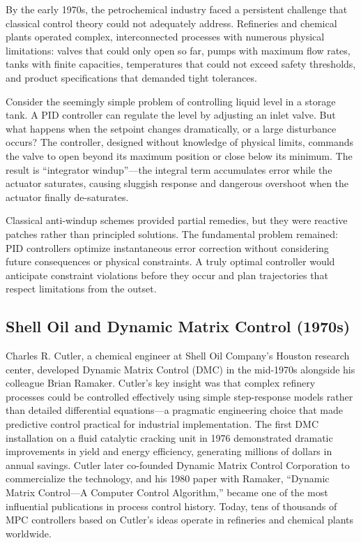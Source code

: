 By the early 1970s, the petrochemical industry faced a persistent challenge that classical control theory could not adequately address. Refineries and chemical plants operated complex, interconnected processes with numerous physical limitations: valves that could only open so far, pumps with maximum flow rates, tanks with finite capacities, temperatures that could not exceed safety thresholds, and product specifications that demanded tight tolerances.

Consider the seemingly simple problem of controlling liquid level in a storage tank. A PID controller can regulate the level by adjusting an inlet valve. But what happens when the setpoint changes dramatically, or a large disturbance occurs? The controller, designed without knowledge of physical limits, commands the valve to open beyond its maximum position or close below its minimum. The result is ``integrator windup''---the integral term accumulates error while the actuator saturates, causing sluggish response and dangerous overshoot when the actuator finally de-saturates.

Classical anti-windup schemes provided partial remedies, but they were reactive patches rather than principled solutions. The fundamental problem remained: PID controllers optimize instantaneous error correction without considering future consequences or physical constraints. A truly optimal controller would anticipate constraint violations before they occur and plan trajectories that respect limitations from the outset.

\subsection{Shell Oil and Dynamic Matrix Control (1970s)}

\begin{historicalbox}
Charles R. Cutler, a chemical engineer at Shell Oil Company's Houston research center, developed Dynamic Matrix Control (DMC) in the mid-1970s alongside his colleague Brian Ramaker. Cutler's key insight was that complex refinery processes could be controlled effectively using simple step-response models rather than detailed differential equations---a pragmatic engineering choice that made predictive control practical for industrial implementation. The first DMC installation on a fluid catalytic cracking unit in 1976 demonstrated dramatic improvements in yield and energy efficiency, generating millions of dollars in annual savings. Cutler later co-founded Dynamic Matrix Control Corporation to commercialize the technology, and his 1980 paper with Ramaker, ``Dynamic Matrix Control---A Computer Control Algorithm,'' became one of the most influential publications in process control history. Today, tens of thousands of MPC controllers based on Cutler's ideas operate in refineries and chemical plants worldwide.
\end{historicalbox}

